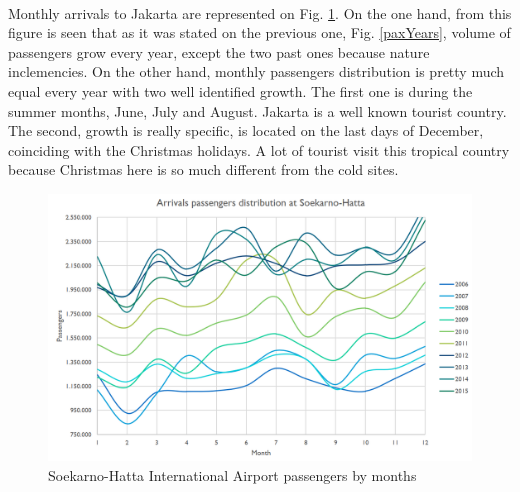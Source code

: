 \paragraph{} Monthly arrivals to Jakarta are represented on Fig. \ref{paxMonths}. On the one hand, from this figure is seen that as it was stated on the previous one, Fig. \ref{paxYears}, volume of passengers grow every year, except the two past ones because nature inclemencies. On the other hand, monthly passengers distribution is pretty much equal every year with two well identified growth. The first one is during the summer months, June, July and August. Jakarta is a well known tourist country. The second, growth is really specific, is located on the last days of December, coinciding with the Christmas holidays. A lot of tourist visit this tropical country because Christmas here is so much different from the cold sites.

\begin{figure}[H]
	\centering
	\includegraphics[clip, trim=0cm 0cm 0cm 0cm, width=1\textwidth]{./images/PROGNOSIS/arrivalsMonthly}
	\caption{Soekarno-Hatta International Airport passengers by months }
	\label{paxMonths}
\end{figure}

